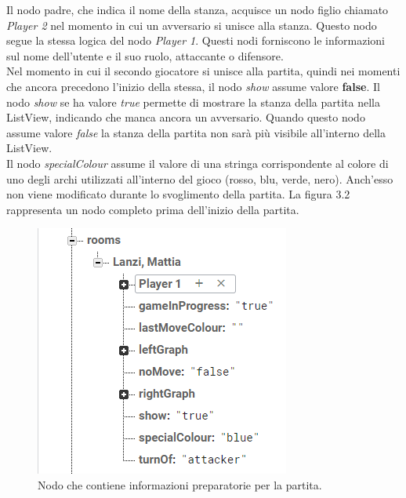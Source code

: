 \documentclass[a4paper,11pt,twoside,openright]{report}
\begin{document}
Il nodo padre, che indica il nome della stanza, acquisce un nodo figlio chiamato \textit{Player 2} nel momento in cui un avversario si unisce alla stanza. Questo nodo segue la stessa logica del nodo \textit{Player 1}. Questi nodi forniscono le informazioni sul nome dell'utente e il suo ruolo, attaccante o difensore.\\
Nel momento in cui il secondo giocatore si unisce alla partita, quindi nei momenti che ancora precedono l'inizio della stessa, il nodo \textit{show} assume valore \textbf{false}.
Il nodo \textit{show} se ha valore \textit{true} permette di mostrare la stanza della partita nella ListView, indicando che manca ancora un avversario. Quando questo nodo assume valore \textit{false} la stanza della partita non sarà più visibile all'interno della ListView.\\
Il nodo \textit{specialColour} assume il valore di una stringa corrispondente al colore di uno degli archi utilizzati all'interno del gioco (rosso, blu, verde, nero). Anch'esso non viene modificato durante lo svoglimento della partita. La figura 3.2 rappresenta un nodo completo prima dell'inizio della partita.\\
\begin{figure}[h]
\includegraphics{images/Match pre node.png}
\caption{Nodo che contiene informazioni preparatorie per la partita.}
\end{figure}
\end{document}
